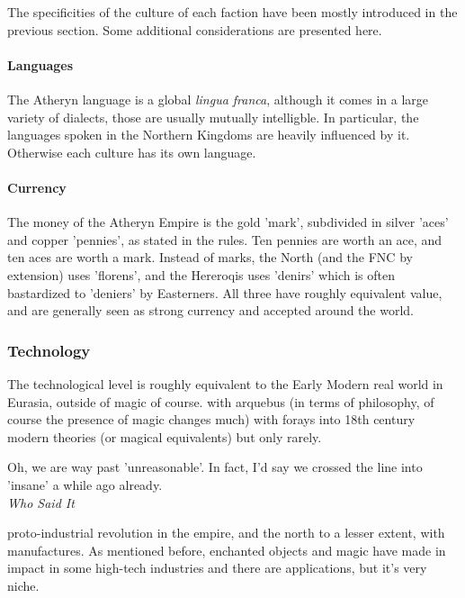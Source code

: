 
The specificities of the culture of each faction have been mostly introduced in the previous section. Some additional considerations are presented here.

\paragraph{Languages}

The Atheryn language is a global \textit{lingua franca}, although it comes in a large variety of dialects, those are usually mutually intelligble. In particular, the languages spoken in the Northern Kingdoms are heavily influenced by it. Otherwise each culture has its own language.

\paragraph{Currency}

The money of the Atheryn Empire is the gold 'mark', subdivided in silver 'aces' and copper 'pennies', as stated in the rules. Ten pennies are worth an ace, and ten aces are worth a mark. Instead of marks, the North (and the FNC by extension) uses 'florens', and the Hereroqis uses 'denirs' which is often bastardized to 'deniers' by Easterners. All three have roughly equivalent value, and are generally seen as strong currency and accepted around the world.


\subsubsection{Technology}

The technological level is roughly equivalent to the Early Modern real world in Eurasia, outside of magic of course. with arquebus (in terms of philosophy, of course the presence of magic changes much) with forays into 18th century modern theories (or magical equivalents) but only rarely.


\begin{rpg-quotebox}
    Oh, we are way past 'unreasonable'. In fact, I'd say we crossed the line into 'insane' a while ago already. \\ \textendash \textit{Who Said It}
\end{rpg-quotebox}

proto-industrial revolution in the empire, and the north to a lesser extent, with manufactures. As mentioned before, enchanted objects and magic have made in impact in some high-tech industries and there are applications, but it's very niche.

